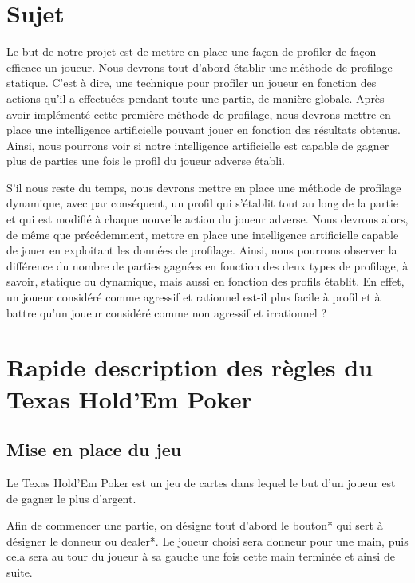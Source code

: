 \documentclass{report}
\begin{document}
\section{Sujet}
\hspace{0.5cm}Le but de notre projet est de mettre en place une façon de profiler de façon efficace un joueur. Nous devrons tout d'abord établir une méthode de profilage statique. C'est à dire, une technique pour profiler un joueur en fonction des actions qu'il a effectuées pendant toute une partie, de manière globale. Après avoir implémenté cette première méthode de profilage, nous devrons mettre en place une intelligence artificielle pouvant jouer en fonction des résultats obtenus. Ainsi, nous pourrons voir si notre intelligence artificielle est capable de gagner plus de parties une fois le profil du joueur adverse établi.\par
S'il nous reste du temps, nous devrons mettre en place une méthode de profilage dynamique, avec par conséquent, un profil qui s’établit tout au long de la partie et qui est modifié à chaque nouvelle action du joueur adverse. Nous devrons alors, de même que précédemment, mettre en place une intelligence artificielle capable de jouer en exploitant les données de profilage. Ainsi, nous pourrons observer la différence du nombre de parties gagnées en fonction des deux types de profilage, à savoir, statique ou dynamique, mais aussi en fonction des profils établit. En effet, un joueur considéré comme agressif et rationnel est-il plus facile à profil et à battre qu'un joueur considéré comme non agressif et irrationnel ?\par

\section{Rapide description des règles du Texas Hold'Em Poker}
\subsection{Mise en place du jeu}
\hspace{0.5cm}Le Texas Hold'Em Poker est un jeu de cartes dans lequel le but d'un joueur est de gagner le plus d'argent. \par
Afin de commencer une partie, on désigne tout d'abord le bouton* qui sert à désigner le donneur ou dealer*. Le joueur choisi sera donneur pour une main, puis cela sera au tour du joueur à sa gauche une fois cette main terminée et ainsi de suite.  \par
\end{document}
